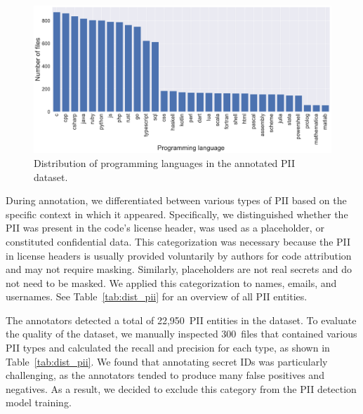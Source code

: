 \documentclass[10pt]{article} %
\begin{document}
\begin{figure}
    \centering
    \includegraphics[scale=0.28]{figures/pii_lang_dist.pdf}
    \caption{Distribution of programming languages in the annotated PII dataset.}
    \label{fig:pii_langs}
\end{figure}

During annotation, we differentiated between various types of PII based on the specific context in which it appeared. Specifically, we distinguished whether the PII was present in the code's license header, was used as a placeholder, or constituted confidential data. This categorization was necessary because the PII in license headers is usually provided voluntarily by authors for code attribution and may not require masking. Similarly, placeholders are not real secrets and do not need to be masked. We applied this categorization to names, emails, and usernames. See Table~\ref{tab:dist_pii} for an overview of all PII entities. 

The annotators detected a total of 22,950~PII entities in the dataset. To evaluate the quality of the dataset, we manually inspected 300~files that contained various PII types and calculated the recall and precision for each type, as shown in Table~\ref{tab:dist_pii}. We found that annotating secret IDs was particularly challenging, as the annotators tended to produce many false positives and negatives. As a result, we decided to exclude this category from the PII detection model training.
\end{document}
